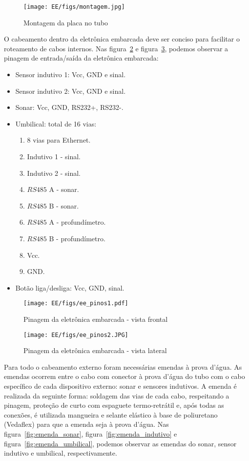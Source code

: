  \begin{figure}[H]
 \centering
 \texttt{[image: EE/figs/montagem.jpg]}
 \caption{Montagem da placa no tubo}
 \label{fig:montagem}
 \end{figure}
 O cabeamento dentro da eletrônica embarcada deve ser conciso para facilitar o
 roteamento de cabos internos. Nas figura~\ref{fig:ee_pinos1} e
 figura~\ref{fig:ee_pinos2}, podemos observar a pinagem de entrada/saída da
 eletrônica embarcada:
 \begin{itemize}
   \item Sensor indutivo 1: Vcc, GND e sinal.
   \item Sensor indutivo 2: Vcc, GND e sinal.
   \item Sonar: Vcc, GND, RS232+, RS232-.
   \item Umbilical: total de 16 vias:
   \begin{enumerate}
     \item 8 vias para Ethernet.
     \item Indutivo 1 - sinal.
     \item Indutivo 2 - sinal.
     \item $RS485$ A - sonar.
     \item $RS485$ B - sonar.
     \item $RS485$ A - profundímetro.
     \item $RS485$ B - profundímetro.
     \item Vcc.
     \item GND.
   \end{enumerate}
   \item Botão liga/desliga: Vcc, GND, sinal. 
 \end{itemize}
 
 \begin{figure}[H]
 \centering
 \texttt{[image: EE/figs/ee\_pinos1.pdf]}
 \caption{Pinagem da eletrônica embarcada - vista frontal}
 \label{fig:ee_pinos1}
 \end{figure}
 
  \begin{figure}[H]
 \centering
 \texttt{[image: EE/figs/ee\_pinos2.JPG]}
 \caption{Pinagem da eletrônica embarcada - vista lateral}
 \label{fig:ee_pinos2}
 \end{figure}
 
 Para todo o cabeamento externo foram necessárias emendas à
 prova d'água. As emendas ocorrem entre o cabo com conector à prova d'água do
 tubo com o cabo específico de cada dispositivo externo: sonar e sensores
 indutivos. A emenda é realizada da seguinte forma: soldagem das vias de
 cada cabo, respeitando a pinagem, proteção de curto com espaguete
 termo-retrátil e, após todas as conexões, é utilizada mangueira e selante
 elástico à base de poliuretano (Vedaflex) para que a emenda seja à prova
 d'água. Nas figura~\ref{fig:emenda_sonar}, figura~\ref{fig:emenda_indutivo} e
 figura~\ref{fig:emenda_umbilical}, podemos observar as emendas do sonar, sensor
 indutivo e umbilical, respectivamente.
  
